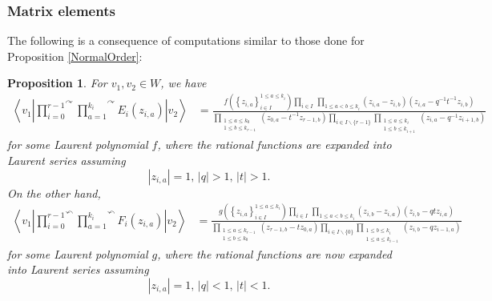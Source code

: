 \documentclass{amsart}
\newtheorem{prop}[thm]{Proposition}
\theoremstyle{remark}
\numberwithin{thm}{section}
\numberwithin{equation}{section}
\begin{document}
\subsubsection{Matrix elements}
The following is a consequence of computations similar to those done for Proposition \ref{NormalOrder}:
\begin{prop}
For $v_1,v_2\in W$, we have
\begin{equation}
\begin{aligned}
\left\langle v_1\left| \overset{\curvearrowright}{\prod_{i=0}^{r-1}}\overset{\curvearrowright}{\prod_{a=1}^{k_i}} E_{i}(z_{i,a})\right|v_2\right\rangle
&=\frac{f\left( \left\{ z_{i,a} \right\}_{i\in I}^{1\le a\le k_i} \right)
\displaystyle\prod_{i\in I}\,\prod_{1\le a<b\le k_i}\left( z_{i,a}-z_{i,b} \right)\left( z_{i,a}-q^{-1}t^{-1}z_{i,b} \right)}
{\displaystyle
\prod_{\substack{1\le a\le k_0\\1\le b\le k_{r-1}}}\left( z_{0,a}-t^{-1}z_{r-1,b} \right)
\prod_{i\in I\backslash\{r-1\}}\prod_{\substack{1\le a \le k_i\\1\le b\le k_{i+1}}}\left(z_{i,a}-q^{-1}z_{i+1,b}\right)}
\end{aligned}
\label{EMatrix}
\end{equation}
for some Laurent polynomial $f$, where the rational functions are expanded into Laurent series assuming
\begin{equation}
|z_{i,a}|=1,\, |q|>1,\, |t|>1.
\label{ERegion}
\end{equation}
On the other hand,
\begin{equation}
\begin{aligned}
\left\langle v_1\left| \overset{\curvearrowleft}{\prod_{i=0}^{r-1}}\overset{\curvearrowleft}{\prod_{a=1}^{k_i}} F_{i}(z_{i,a})\right|v_2\right\rangle
&=\frac{g\left( \left\{ z_{i,a} \right\}_{i\in I}^{1\le a\le k_i} \right)
\displaystyle\prod_{i\in I}\,\prod_{1\le a<b\le k_i}\left( z_{i,b}-z_{i,a} \right)\left( z_{i,b}-qtz_{i,a} \right)}
{\displaystyle
\prod_{\substack{1\le a\le k_{r-1}\\1\le b\le k_{0}}}\left( z_{r-1,b}-tz_{0,a} \right)
\prod_{i\in I\backslash\{0\}}\prod_{\substack{1\le b \le k_i\\1\le a\le k_{i-1}}}\left(z_{i,b}-qz_{i-1,a}\right)}
\end{aligned}
\label{FMatrix}
\end{equation}
for some Laurent polynomial $g$, where the rational functions are now expanded into Laurent series assuming
\begin{equation}
|z_{i,a}|=1,\, |q|<1,\, |t|<1.
\label{FRegion}
\end{equation}
\end{prop}
\end{document}
